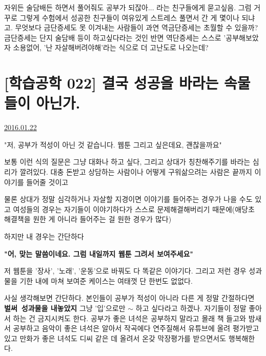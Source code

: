 자위든 술담배든 하면서 풀어줘도 공부가 되잖아... 라는 친구들에게 묻고싶음.
그럼 거꾸로 그렇게 수험에서 성공한 친구들이 여유있게 스트레스 풀면서 간 게 몇이나 되냐고.
무엇보다 금단증세도 못 이겨내는 사람들이 과연 역금단증세는 초월할 수 있을까?
금단증세는 단지 술담배 등이 하고싶다라는 것인 반면
역단증세는 스스로 '공부해보았자 소용없어, '난 자살해버려야해'라는 식으로 더 고난도로 나오는데?
\vspace{5mm}






\section{[학습공학 022] 결국 성공을 바라는 속물들이 아닌가.}
\href{https://www.kockoc.com/Apoc/604826}{2016.01.22}

\vspace{5mm}

"저, 공부가 적성이 아닌 것 같습니다. 웹툰 그리고 싶은데요, 괜찮을까요"
\vspace{5mm}

보통 이런 식의 질문은 그냥 대화나 하고 싶다, 그리고 상대가 칭찬해주기를 바라는 심리가 깔려있다.
대충 돈받고 상담하는 사람이나 어떻게 구워삶으려는 사람은 끝까지 이야기를 들어줄 것이고
\vspace{5mm}

물론 상대가 정말 심각하거나 자살할 지경이면 이야기를 들어주는 경우가 나을 수도 있고
여성들의 경우는 자기들이 이야기하다가 스스로 문제해결해버리기 때문에(애당초 해결책을 원한 게 아니라 들어주는 걸 원한 경우가 많다)
\vspace{5mm}

하지만 내 경우는 간단하다
\vspace{5mm}

\textbf{"어, 맞는 말씀이네요. 그럼 내일까지 웹툰 그려서 보여주세요"}
\vspace{5mm}

저 웹툰을 '장사', '노래', '운동'으로 바꿔도 다 똑같은 이야기다.
그리고 저런 경우 성과물을 기한 내에 마쳐 보여준 케이스는 여태껏 단 한번도 없없다.
\vspace{5mm}

사실 생각해보면 간단하다.
본인들이 공부가 적성이 아니라 다른 게 정말 간절하다면 \textbf{벌써 성과물을 내놓았지} 그냥 '입'으로만 $\sim$ 하고 싶다라고 하겠나.
자기들이 정말 좋아서 하는 건 금지시켜도 한다.
공부가 좋은 녀석은 공부하지 말라고 몰래 책 들고와 밤새서 공부하고
음악이 좋은 녀석은 알아서 작곡에다 연주질해서 유튜브에 올려 평가받고 있고
만화가 좋은 녀석도 디씨 같은 데 올려서 온갖 막장평가를 받으면서도 행복해한다.
\vspace{5mm}

